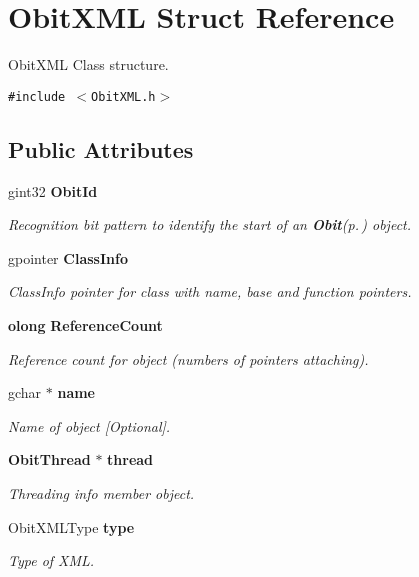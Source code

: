 \section{Obit\-XML Struct Reference}
\label{structObitXML}
Obit\-XML Class structure.  


{\tt \#include $<$Obit\-XML.h$>$}

\subsection*{Public Attributes}
\begin{CompactItemize}
\item 
gint32 {\bf Obit\-Id}
\begin{CompactList}\small\item\em Recognition bit pattern to identify the start of an {\bf Obit}{\rm (p.\,\pageref{structObit})} object. \item\end{CompactList}\item 
gpointer {\bf Class\-Info}
\begin{CompactList}\small\item\em Class\-Info pointer for class with name, base and function pointers. \item\end{CompactList}\item 
{\bf olong} {\bf Reference\-Count}
\begin{CompactList}\small\item\em Reference count for object (numbers of pointers attaching). \item\end{CompactList}\item 
gchar $\ast$ {\bf name}
\begin{CompactList}\small\item\em Name of object [Optional]. \item\end{CompactList}\item 
{\bf Obit\-Thread} $\ast$ {\bf thread}
\begin{CompactList}\small\item\em Threading info member object. \item\end{CompactList}\item 
Obit\-XMLType {\bf type}
\begin{CompactList}\small\item\em Type of XML. \item\end{CompactList}\item 

\end{CompactItemize}

